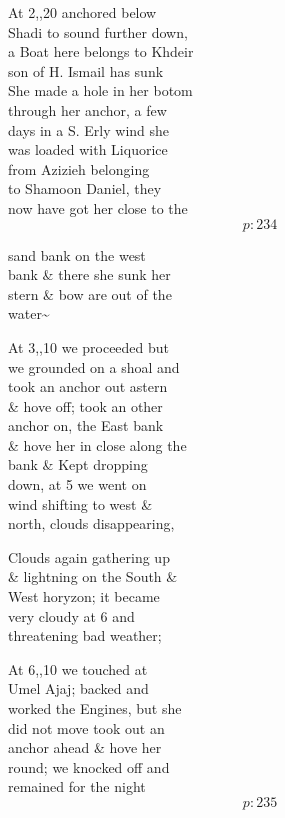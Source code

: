 \documentclass{report}
\begin{document}
	\par{
 	At 2,,20 anchored below\ \\Shadi to sound further down,\ \\a Boat here belongs to Khdeir\ \\son of H. Ismail has sunk\ \\She made a hole in her botom\ \\through her anchor, a few\ \\days in a S. Erly wind she\ \\was loaded with Liquorice\ \\from Azizieh belonging\ \\to Shamoon Daniel, they\ \\now have got her close to the\ \\
  \[p: 234 \]

	}

	\par{
 	sand bank on the west\ \\bank \& there she sunk her\ \\stern \& bow are out of the\ \\water\~{}\ \\
	}

	\par{
 	At 3,,10 we proceeded but\ \\we grounded on a shoal and\ \\took an anchor out astern\ \\\& hove off; took an other\ \\anchor on, the East bank\ \\\& hove her in close along the\ \\bank \& Kept dropping\ \\down, at 5 we went on\ \\wind shifting to west \&\ \\north, clouds disappearing,\ \\
	}

	\par{
 	Clouds again gathering up\ \\\& lightning on the South \&\ \\West horyzon; it became\ \\very cloudy at 6 and\ \\threatening bad weather;\ \\
	}

	\par{
 	At 6,,10 we touched at\ \\Umel Ajaj; backed and\ \\worked the Engines, but she\ \\did not move took out an\ \\anchor ahead \& hove her\ \\round; we knocked off and\ \\remained for the night\ \\
  \[p: 235 \]

	}
\end{document}
